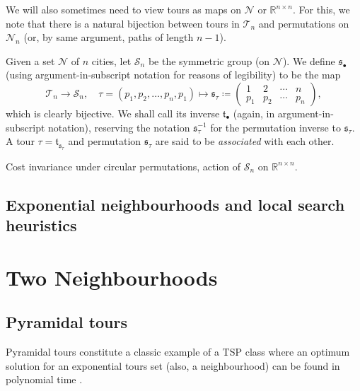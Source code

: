 \documentclass[index=totoc,bibliography=totoc]{scrartcl}
\newcommand{\annotation}[1]{\marginpar{\small\itshape\color{green}#1}}
\let\defstyle\itshape
\begin{document}
We will also sometimes need to view tours as maps on $\mathcal{N}$ or
$\mathbb{R}^{n \times n}$.  For this, we note that there is a natural
bijection between tours in $\mathcal{T}_n$ and permutations on
$\mathcal{N}_n$ (or, by same argument, paths of length $n-1$).
\begin{define}
Given a set $\mathcal{N}$ of $n$ cities, let $\mathcal{S}_n$ be the symmetric group (on $\mathcal{N}$).
We define $\mathfrak{s}_{\bullet}$ (using argument-in-subscript notation for reasons of legibility) to be the map
\[
  \mathcal{T}_n \to \mathcal{S}_n,
  \quad \tau = \left(p_1,p_2,\ldots,p_n,p_1\right) \mapsto
  \mathfrak{s}_\tau \coloneqq
  \left( \begin{smallmatrix}
    1 & 2 & \cdots & n \\
    p_1 & p_2 & \cdots &  p_n
  \end{smallmatrix} \right),
\]
which is clearly bijective.  We shall call its inverse $\mathfrak{t}_{\bullet}$ (again, in argument-in-subscript notation),
reserving the notation $\mathfrak{s}_{\tau}^{-1}$ for the
permutation inverse to $\mathfrak{s}_{\tau}$.
A tour $\tau = \mathfrak{t}_{\mathfrak{s}_{\tau}}$ and permutation $\mathfrak{s}_{\tau}$ are said to be {\defstyle associated} with each other.
\end{define}

\begin{remark}
  \annotation{TODO}
  Cost invariance under circular permutations, action of $\mathcal{S}_n$ on $\mathbb{R}^{n \times n}$.
\end{remark}

\subsection{Exponential neighbourhoods and local search heuristics}

\clearpage
{}
\section{Two Neighbourhoods}

\subsection{Pyramidal tours}

\annotation{Who was first?}
Pyramidal tours constitute a classic example of a TSP class where an
optimum solution for an exponential tours set (also, a neighbourhood) can
be found in polynomial time \cite{bellman,gilmore}.
\end{document}

